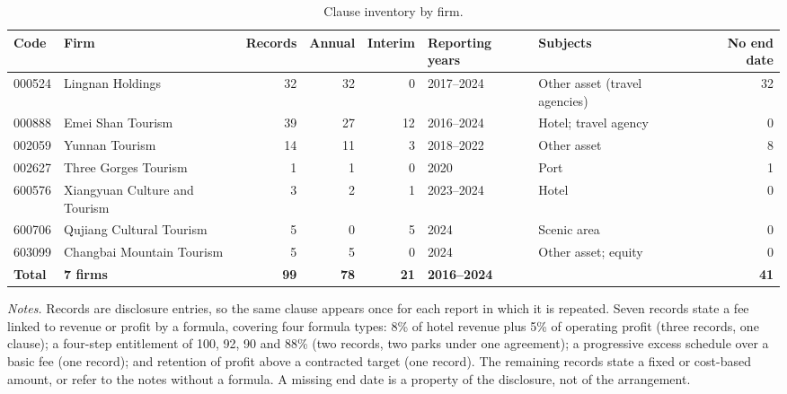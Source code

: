 \documentclass[review,3p,times]{elsarticle}
\begin{document}
\begin{table}[!htbp]
\centering
\renewcommand{\thetable}{A5}
\caption{Clause inventory by firm.}\label{tab:A5}
\begin{minipage}{\textwidth}
\centering
\footnotesize
\begin{adjustbox}{max width=\textwidth}
\begin{tabular}{@{}llrrrllr@{}}
\toprule
Code & Firm & Records & Annual & Interim & Reporting years & Subjects & No end date \\
\midrule
000524 & Lingnan Holdings & 32 & 32 & 0 & 2017--2024 & Other asset (travel agencies) & 32 \\
000888 & Emei Shan Tourism & 39 & 27 & 12 & 2016--2024 & Hotel; travel agency & 0 \\
002059 & Yunnan Tourism & 14 & 11 & 3 & 2018--2022 & Other asset & 8 \\
002627 & Three Gorges Tourism & 1 & 1 & 0 & 2020 & Port & 1 \\
600576 & Xiangyuan Culture and Tourism & 3 & 2 & 1 & 2023--2024 & Hotel & 0 \\
600706 & Qujiang Cultural Tourism & 5 & 0 & 5 & 2024 & Scenic area & 0 \\
603099 & Changbai Mountain Tourism & 5 & 5 & 0 & 2024 & Other asset; equity & 0 \\
\textbf{Total} & \textbf{7 firms} & \textbf{99} & \textbf{78} & \textbf{21} & \textbf{2016--2024} &  & \textbf{41} \\
\bottomrule
\end{tabular}
\end{adjustbox}
\par\medskip
\raggedright
\noindent\textit{Notes.} Records are disclosure entries, so the same clause appears once for each report in which it is repeated. Seven records state a fee linked to revenue or profit by a formula, covering four formula types: 8\% of hotel revenue plus 5\% of operating profit (three records, one clause); a four-step entitlement of 100, 92, 90 and 88\% (two records, two parks under one agreement); a progressive excess schedule over a basic fee (one record); and retention of profit above a contracted target (one record). The remaining records state a fixed or cost-based amount, or refer to the notes without a formula. A missing end date is a property of the disclosure, not of the arrangement.
\end{minipage}
\end{table}
\end{document}
